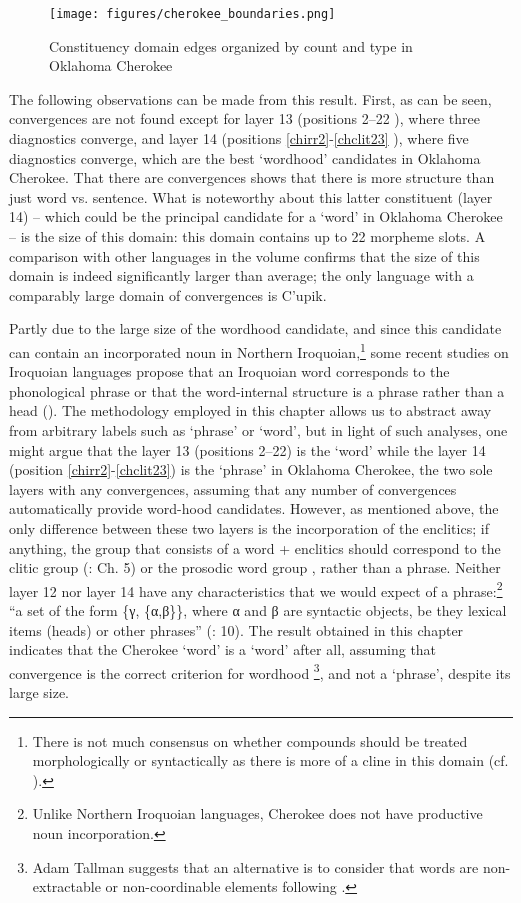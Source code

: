 \documentclass[output=paper]{langscibook}
\begin{document}
\begin{figure}
    \centering
    \texttt{[image: figures/cherokee\_boundaries.png]}
    \caption{Constituency domain edges organized by count and type in Oklahoma Cherokee}
    \label{fig:boundary}
\end{figure}

The following observations can be made from this result. First, as can be seen, convergences are not found except for layer 13 (positions 2--22 ), where three diagnostics converge, and layer 14 (positions \ref{chirr2}-\ref{chclit23} ), where five diagnostics converge, which are the best `wordhood' candidates in Oklahoma Cherokee. That there are convergences shows that there is more structure than just word vs. sentence. What is noteworthy about this latter constituent (layer 14) – which could be the principal candidate for a `word' in Oklahoma Cherokee – is the size of this domain: this domain contains up to 22 morpheme slots. A comparison with other languages in the volume confirms that the size of this domain is indeed significantly larger than average; the only language with a comparably large domain of convergences is C'upik.

Partly due to the large size of the wordhood candidate, and since this candidate can contain an incorporated noun in Northern Iroquoian,\footnote{There is not much consensus on whether compounds should be treated morphologically or syntactically as there is more of a cline in this domain (cf. \citealt{Tallman2021}).} some recent studies on Iroquoian languages propose that an Iroquoian word corresponds to the phonological phrase \citep{Dyck2009} or that the word-internal structure is a phrase rather than a head (\citealt{BarrieMatthieu2016}). The methodology employed in this chapter allows us to abstract away from arbitrary labels such as `phrase' or `word', but in light of such analyses, one might argue that the layer 13 (positions 2--22) is the `word' while the layer 14 (position \ref{chirr2}-\ref{chclit23}) is the `phrase' in Oklahoma Cherokee, the two sole layers with any convergences, assuming that any number of convergences automatically provide word-hood candidates. However, as mentioned above, the only difference between these two layers is the incorporation of the enclitics; if anything, the group that consists of a word + enclitics should correspond to the clitic group (\citealt{Nespor1986}: Ch. 5) or the prosodic word group \citep{Vigario2010}, rather than a phrase. Neither layer 12 nor layer 14 have any characteristics that we would expect of a phrase:\footnote{Unlike Northern Iroquoian languages, Cherokee does not have productive noun incorporation.}  “a set of the form \{γ, \{α,β\}\}, where α and β are syntactic objects, be they lexical items (heads) or other phrases” (\citealt{BarrieMatthieu2010}: 10). The result obtained in this chapter indicates that the Cherokee `word' is a `word' after all, assuming that convergence is the correct criterion for wordhood \citep{Matthews2002}\footnote{Adam Tallman suggests that an alternative is to consider that words are non-extractable or non-coordinable elements following \cite{Bruening2018}.}, and not a `phrase', despite its large size. 
\end{document}

